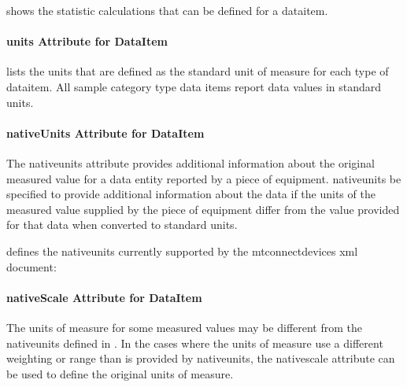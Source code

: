 shows the \gls{statistic} calculations that can be defined for a \gls{dataitem}.



\pagebreak

\paragraph{units Attribute for DataItem}\label{sec:units Attribute for DataItem}\mbox{}

 lists the units that are defined as the standard unit of measure for each type of \gls{dataitem}.  All \gls{sample category} type data items \must report data values in standard units.     



\paragraph{nativeUnits Attribute for DataItem}\label{sec:nativeUnits Attribute for DataItem}\mbox{}

The \gls{nativeunits} attribute provides additional information about the original measured value for a \gls{data entity} reported by a piece of equipment.  \gls{nativeunits} \may be specified to provide additional information about the data if the units of the measured value supplied by the piece of equipment differ from the value provided for that data when converted to standard units.

 defines the \gls{nativeunits} currently supported by the \gls{mtconnectdevices} \gls{xml} document:



\paragraph{nativeScale Attribute for DataItem}\mbox{}

The units of measure for some measured values may be different from the \gls{nativeunits} defined in .   In the cases where the units of measure use a different weighting or range than is provided by \gls{nativeunits}, the \gls{nativescale} attribute can be used to define the original units of measure.

